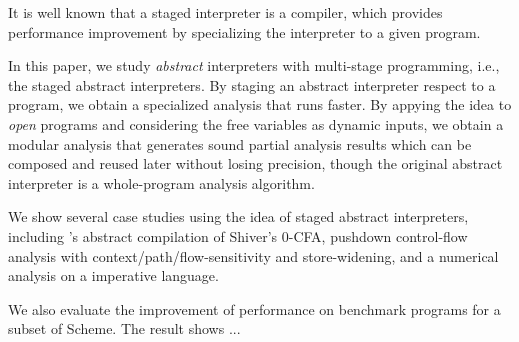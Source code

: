 It is well known that a staged interpreter is a compiler, which provides performance improvement
by specializing the interpreter to a given program.

In this paper, we study \textit{abstract} interpreters with multi-stage programming, i.e., the 
staged abstract interpreters. 
By staging an abstract interpreter respect to a program, we obtain a specialized analysis that runs faster.
By appying the idea to \textit{open} programs and considering the free variables as dynamic inputs, 
we obtain a modular analysis that generates sound partial analysis results which can be composed 
and reused later without losing precision, though the original abstract interpreter is a whole-program 
analysis algorithm.

We show several case studies using the idea of staged abstract interpreters, including 
\citeauthor{Boucher:1996:ACN:647473.727587}'s abstract compilation of Shiver's 0-CFA, pushdown
control-flow analysis with context/path/flow-sensitivity and store-widening, and a numerical
analysis on a imperative language.

We also evaluate the improvement of performance on benchmark programs for a subset of Scheme.
The result shows ...

